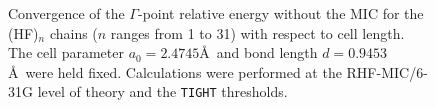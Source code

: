 \documentclass[prl,twocolumn,showpacs,twocolumngrid,superbib]{revtex4}
\begin{document}
\begin{figure}[h]
  \caption{Convergence of the $\Gamma$-point relative energy without the MIC
    for the (HF)$_n$ chains ($n$ ranges from 1 to 31) with respect to cell length. 
    The cell parameter $a_0=2.4745$\AA~and bond length $d=0.9453$\AA~were held fixed. 
    Calculations were performed at the RHF-MIC/6-31G level of theory and the {\tt TIGHT} thresholds.}\label{Fig:CnvgEnergyNoMIC}
\end{figure}
\end{document}
